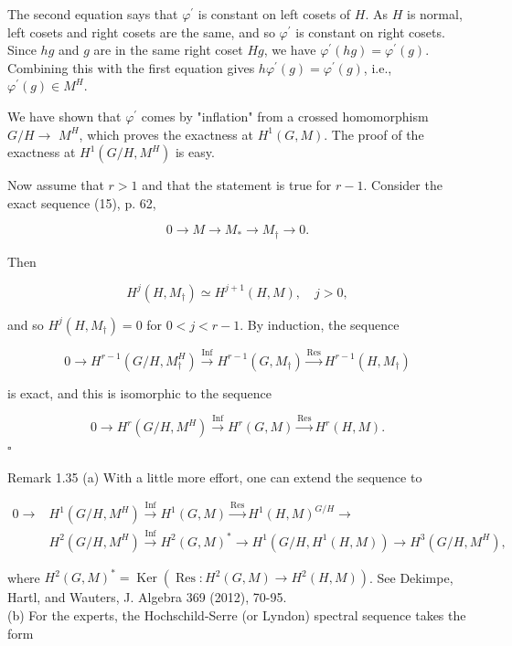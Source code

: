 \documentclass[10pt]{article}
\begin{document}
The second equation says that $\varphi^{\prime}$ is constant on left cosets of $H$. As $H$ is normal, left cosets and right cosets are the same, and so $\varphi^{\prime}$ is constant on right cosets. Since $h g$ and $g$ are in the same right coset $H g$, we have $\varphi^{\prime}(h g)=\varphi^{\prime}(g)$. Combining this with the first equation gives $h \varphi^{\prime}(g)=\varphi^{\prime}(g)$, i.e., $\varphi^{\prime}(g) \in M^{H}$.

We have shown that $\varphi^{\prime}$ comes by "inflation" from a crossed homomorphism $G / H \rightarrow$ $M^{H}$, which proves the exactness at $H^{1}(G, M)$. The proof of the exactness at $H^{1}\left(G / H, M^{H}\right)$ is easy.

Now assume that $r>1$ and that the statement is true for $r-1$. Consider the exact sequence (15), p. 62,

$$
0 \rightarrow M \rightarrow M_{*} \rightarrow M_{\dagger} \rightarrow 0 .
$$

Then

$$
H^{j}\left(H, M_{\dagger}\right) \simeq H^{j+1}(H, M), \quad j>0,
$$

and so $H^{j}\left(H, M_{\dagger}\right)=0$ for $0<j<r-1$. By induction, the sequence

$$
0 \rightarrow H^{r-1}\left(G / H, M_{\dagger}^{H}\right) \xrightarrow{\operatorname{Inf}} H^{r-1}\left(G, M_{\dagger}\right) \xrightarrow{\operatorname{Res}} H^{r-1}\left(H, M_{\dagger}\right)
$$

is exact, and this is isomorphic to the sequence

$$
0 \rightarrow H^{r}\left(G / H, M^{H}\right) \xrightarrow{\operatorname{Inf}} H^{r}(G, M) \xrightarrow{\operatorname{Res}} H^{r}(H, M) .
$$ \(\square\)

Remark 1.35 (a) With a little more effort, one can extend the sequence to

$$
\begin{aligned}
0 \rightarrow & H^{1}\left(G / H, M^{H}\right) \xrightarrow{\operatorname{Inf}} H^{1}(G, M) \xrightarrow{\operatorname{Res}} H^{1}(H, M)^{G / H} \rightarrow \\
& H^{2}\left(G / H, M^{H}\right) \xrightarrow{\operatorname{Inf}} H^{2}(G, M)^{*} \rightarrow H^{1}\left(G / H, H^{1}(H, M)\right) \rightarrow H^{3}\left(G / H, M^{H}\right),
\end{aligned}
$$

where $H^{2}(G, M)^{*}=\operatorname{Ker}\left(\operatorname{Res}: H^{2}(G, M) \rightarrow H^{2}(H, M)\right)$. See Dekimpe, Hartl, and Wauters, J. Algebra 369 (2012), 70-95.\\
(b) For the experts, the Hochschild-Serre (or Lyndon) spectral sequence takes the form
\end{document}
